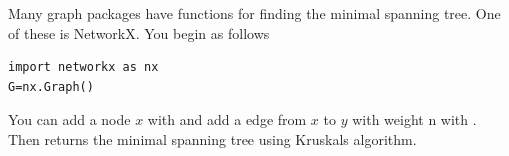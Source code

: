 Many graph packages have functions for finding the minimal spanning tree. One of these is NetworkX. You begin as follows
\begin{lstlisting}
import networkx as nx
G=nx.Graph()
\end{lstlisting}
You can add a node $x$ with  and add a edge from $x$ to $y$ with weight n with . Then  returns the minimal spanning tree using Kruskals algorithm.

